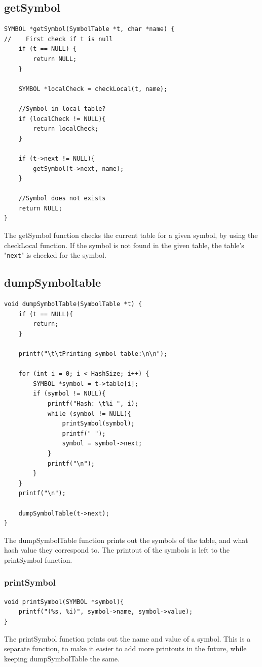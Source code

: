 \documentclass[a4paper,10pt,titlepage]{report}
\begin{document}
\subsection{getSymbol}
\begin{lstlisting}
SYMBOL *getSymbol(SymbolTable *t, char *name) {
//    First check if t is null
    if (t == NULL) {
        return NULL;
    }

    SYMBOL *localCheck = checkLocal(t, name);

    //Symbol in local table?
    if (localCheck != NULL){
        return localCheck;
    }

    if (t->next != NULL){
        getSymbol(t->next, name);
    }

    //Symbol does not exists
    return NULL;
}
\end{lstlisting}
The getSymbol function checks the current table for a given symbol, by using the checkLocal function. If the symbol is not found in the given table, the table's "\verb!next!" is checked for the symbol.

\subsection{dumpSymboltable}
\begin{lstlisting}
void dumpSymbolTable(SymbolTable *t) {
    if (t == NULL){
        return;
    }

    printf("\t\tPrinting symbol table:\n\n");

    for (int i = 0; i < HashSize; i++) {
        SYMBOL *symbol = t->table[i];
        if (symbol != NULL){
            printf("Hash: \t%i ", i);
            while (symbol != NULL){
                printSymbol(symbol);
                printf(" ");
                symbol = symbol->next;
            }
            printf("\n");
        }
    }
    printf("\n");

    dumpSymbolTable(t->next);
}
\end{lstlisting}
The dumpSymbolTable function prints out the symbols of the table, and what hash value they correspond to. The printout of the symbols is left to the printSymbol function.

\subsubsection{printSymbol}
\begin{lstlisting}
void printSymbol(SYMBOL *symbol){
    printf("(%s, %i)", symbol->name, symbol->value);
}
\end{lstlisting}
The printSymbol function prints out the name and value of a symbol. This is a separate function, to make it easier to add more printouts in the future, while keeping dumpSymbolTable the same.
\newpage
\end{document}
